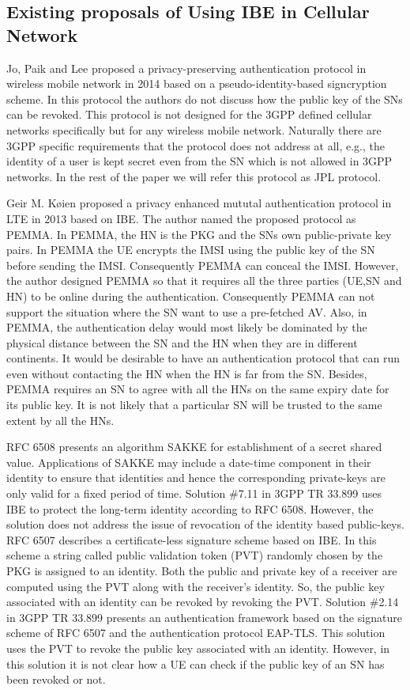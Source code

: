 \documentclass{river-journal}
\begin{document}
\subsection{Existing proposals of Using IBE in Cellular Network}
Jo, Paik and Lee proposed a privacy-preserving authentication protocol in wireless mobile network in 2014 \cite{IEE_transactions_mobile_computing_2014} based on a pseudo-identity-based signcryption scheme. In this protocol the authors do not discuss how the public key of the SNs can be revoked. This protocol is not designed for the 3GPP defined cellular networks specifically but for any wireless mobile network. Naturally there are 3GPP specific requirements that the protocol does not address at all, e.g., the identity of a user is kept secret even from the SN which is not allowed in 3GPP networks. In the rest of the paper we will refer this protocol as JPL protocol.

Geir M. K{\o}ien proposed a privacy enhanced mututal authentication protocol in LTE in 2013 \cite{koienibe} based on IBE. The author named the proposed protocol as PEMMA. In PEMMA, the HN is the PKG and the SNs own public-private key pairs. In PEMMA the UE encrypts the IMSI using the public key of the SN before sending the IMSI. Consequently PEMMA can conceal the IMSI. However, the author designed PEMMA so that it requires all the three parties (UE,SN and HN) to be online during the authentication. Consequently PEMMA can not support the situation where the SN want to use a pre-fetched AV. Also, in PEMMA, the authentication delay would most likely be dominated by the physical distance between the SN and the HN when they are in different continents. It would be desirable to have an authentication protocol that can run even without contacting the HN when the HN is far from the SN. Besides, PEMMA requires an SN to agree with all the HNs on the same expiry date for its public key. It is not likely that a particular SN will be trusted to the same extent by all the HNs.

RFC 6508 \cite{RFC6508} presents an algorithm SAKKE for establishment of a secret shared value. Applications of SAKKE may include a date-time component in their identity to ensure that identities and hence the corresponding private-keys are only valid for a fixed period of time. Solution \#7.11 in 3GPP TR 33.899 \cite{TR33899} uses IBE to protect the long-term identity according to RFC 6508. However, the solution does not address the issue of revocation of the identity based public-keys. RFC 6507 \cite{RFC6507} describes a certificate-less signature scheme based on IBE. In this scheme a string called public validation token (PVT) randomly chosen by the PKG is assigned to an identity. Both the public and private key of a receiver are computed using the PVT along with the receiver's identity. So, the public key associated with an identity can be revoked by revoking the PVT. Solution \#2.14 in 3GPP TR 33.899 presents an authentication framework based on the signature scheme of RFC 6507 and the authentication protocol EAP-TLS. This solution uses the PVT to revoke the public key associated with an identity. However, in this solution it is not clear how a UE can check if the public key of an SN has been revoked or not.
\end{document}
